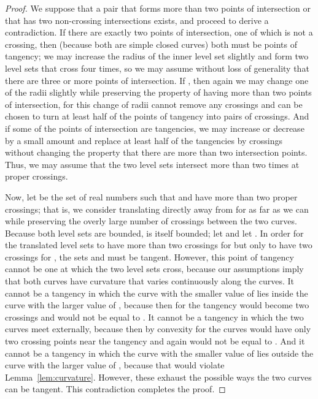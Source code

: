 \documentclass[10pt, conference, compsocconf]{IEEEtran}
\begin{document}
\begin{proof}
We suppose that a pair that forms more than two points of intersection or that has two non-crossing intersections exists, and proceed to derive a contradiction. If there are exactly two points of intersection, one of which is not a crossing, then (because both are simple closed curves) both must be points of tangency; we may increase the radius of the inner level set slightly and form two level sets that cross four times, so we may assume without loss of generality that there are three or more points of intersection. If , then again we may change one of the radii slightly while preserving the property of having more than two points of intersection, for this change of radii cannot remove any crossings and can be chosen to turn at least half of the points of tangency into pairs of crossings.
And if some of the points of intersection are tangencies, we may increase or decrease  by a small amount and replace at least half of the tangencies by crossings without changing the property that there are more than two intersection points. Thus, we may assume that the two level sets intersect more than two times at proper crossings.

Now, let  be the set of real numbers  such that  and  have more than two proper crossings; that is, we consider translating  directly away from  for as far as we can while preserving the overly large number of crossings between the two curves. Because both level sets are bounded,  is itself bounded; let  and let .
In order for the translated level sets to have more than two crossings for  but only to have two crossings for , the sets  and  must be tangent. However, this point of tangency cannot be one at which the two level sets cross, because our assumptions imply that both curves have curvature that varies continuously along the curves. It cannot be a tangency in which the curve with the smaller value of  lies inside the curve with the larger value of , because then for  the tangency would become two crossings and  would not be equal to . It cannot be a tangency in which the two curves meet externally, because then by convexity for  the curves would have only two crossing points near the tangency and again  would not be equal to . And it cannot be a tangency in which the curve with the smaller value of  lies outside the curve with the larger value of , because that would violate Lemma~\ref{lem:curvature}. However, these exhaust the possible ways the two curves can be tangent. This contradiction completes the proof.
\end{proof}
\end{document}
